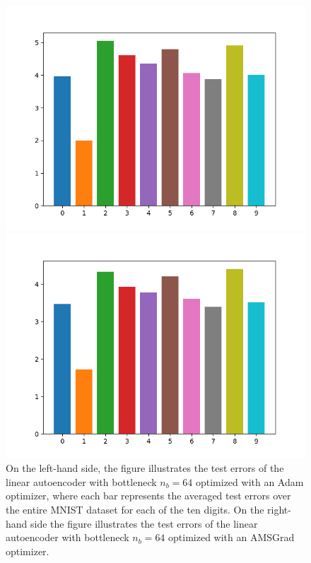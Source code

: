 \begin{figure}
\begin{center}
   \begin{minipage}[b]{0.49\linewidth}
      \includegraphics[trim = 15mm 5mm 15mm 10mm, clip, width=\linewidth]{linear_AE_64d_adam_errors}
	\end{minipage}
   \begin{minipage}[b]{0.49\linewidth}
      \includegraphics[trim = 15mm 5mm 15mm 10mm, clip, width=\linewidth]{linear_AE_64d_amsgrad_errors}
	\end{minipage}
\end{center}
\caption{On the left-hand side, the figure illustrates the test errors of the linear autoencoder with bottleneck $n_b=64$ optimized with an Adam optimizer, where each bar represents the averaged test errors over the entire MNIST dataset for each of the ten digits. On the right-hand side the figure illustrates the test errors of the linear autoencoder with bottleneck $n_b=64$ optimized with an AMSGrad optimizer.}\label{fig:linear_AE_64d_errors}
\end{figure}

